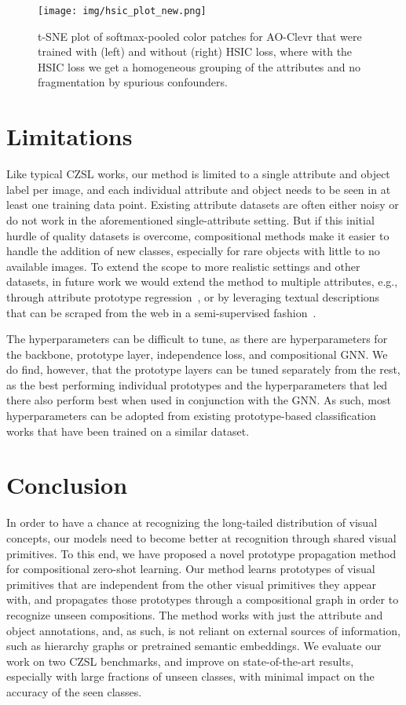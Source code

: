 \documentclass{article}
\begin{document}
\begin{figure}
    \centering
    \texttt{[image: img/hsic\_plot\_new.png]}
    \caption{t-SNE plot of softmax-pooled color patches for AO-Clevr that were trained with (left) and without (right) HSIC loss, where with the HSIC loss we get a homogeneous grouping of the attributes and no fragmentation by spurious confounders.}
    \label{fig:hsic_plot}
\end{figure}

\section{Limitations}
\label{sec:limitations}
Like typical CZSL works, our method is limited to a single attribute and object label per image, and each individual attribute and object needs to be seen in at least one training data point. Existing attribute datasets are often either noisy or do not work in the aforementioned single-attribute setting. But if this initial hurdle of quality datasets is overcome, compositional methods make it easier to handle the addition of new classes, especially for rare objects with little to no available images. To extend the scope to more realistic settings and other datasets, in future work we would extend the method to multiple attributes, e.g., through attribute prototype regression~\citep{xu2020attribute}, or by leveraging textual descriptions that can be scraped from the web in a semi-supervised fashion~\citep{zhu2018generative}.

The hyperparameters can be difficult to tune, as there are hyperparameters for the backbone, prototype layer, independence loss, and compositional GNN. We do find, however, that the prototype layers can be tuned separately from the rest, as the best performing individual prototypes and the hyperparameters that led there also perform best when used in conjunction with the GNN. As such, most hyperparameters can be adopted from existing prototype-based classification works that have been trained on a similar dataset.

\section{Conclusion}
In order to have a chance at recognizing the long-tailed distribution of visual concepts, our models need to become better at recognition through shared visual primitives. To this end,  we have proposed a novel prototype propagation method for compositional zero-shot learning. Our method learns prototypes of visual primitives that are independent from the other visual primitives they appear with, and propagates those prototypes through a compositional graph in order to recognize unseen compositions. The method works with just the attribute and object annotations, and, as such, is not reliant on external sources of information, such as hierarchy graphs or pretrained semantic embeddings. We evaluate our work on two CZSL benchmarks, and improve on state-of-the-art results, especially with large fractions of unseen classes, with minimal impact on the accuracy of the seen classes.
\end{document}
